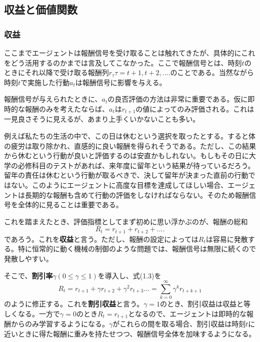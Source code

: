 \documentclass[dvipdfmx, 9pt, a4paper]{jsarticle}
\numberwithin{equation}{section}
\begin{document}
\subsection{収益と価値関数}
\subsubsection{収益}
ここまでエージェントは報酬信号を受け取ることは触れてきたが、具体的にこれをどう活用するのかまでは言及してこなかった。ここで報酬信号とは、時刻$t$のときにそれ以降で受け取る報酬列$r_\tau{\tau=t+1, t+2, ....}$のことである。当然ながら時刻$t$で実施した行動$a_t$は報酬信号に影響を与える。\par
報酬信号が与えられたときに、$a_t$の良否評価の方法は非常に重要である。仮に即時的な報酬のみを考えたならば、$a_t$は$r_{t+1}$の値によってのみ評価される。これは一見良さそうに見えるが、あまり上手くいかないことも多い。\par
例えば私たちの生活の中で、この日は休むという選択を取ったとする。すると体の疲労は取り除かれ、直感的に良い報酬を得られそうである。ただし、この結果から休むという行動が良いと評価するのは安直かもしれない。もしもその日に大学の必修科目のテストがあれば、来年度に留年という結果が待っているだろう。留年の責任は休むという行動が取るべきで、決して留年が決まった直前の行動ではない。このようにエージェントに高度な目標を達成してほしい場合、エージェントは長期的な報酬も含めて行動の評価をしなければならない。そのため報酬信号を全体的に見ることは重要である。\par
これを踏まえたとき、評価指標としてまず初めに思い浮かぶのが、報酬の総和
\begin{equation}
R_t=r_{t+1}+r_{t+2}+....
\end{equation}
であろう。これを{\bf 収益}と言う。ただし、報酬の設定によっては$R_t$は容易に発散する。特に恒常的に動く機械の制御のような問題では、報酬信号は無限に続くので発散しやすい。\par
そこで、{\bf 割引率}$\gamma(0 \leq \gamma \leq 1)$を導入し、式(1.3)を
\begin{equation}
R_t=r_{t+1}+\gamma r_{t+2}+\gamma^2r_{t+3}...=\sum_{k=0}^\infty \gamma^kr_{t+k+1}
\end{equation}
のように修正する。これを{\bf 割引収益}と言う。$\gamma=1$のとき、割引収益は収益と等しくなる。一方で$\gamma=0$のとき$R_t=r_{t+1}$となるので、エージェントは即時的な報酬からのみ学習するようになる。$\gamma$がこれらの間を取る場合、割引収益は時刻$t$に近いときに得た報酬に重みを持たせつつ、報酬信号全体を加味するようになる。
\end{document}
